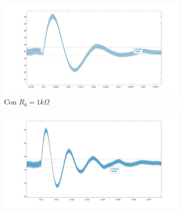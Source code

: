 \documentclass[e4_tp2_main.tex]{subfiles}
\begin{document}
\begin{figure}[H]
  \begin{subfigure}[b]{0.3\textwidth}
    \includegraphics[width=\textwidth, height=\textwidth]{Imagenes/Punto1/Test_con_R6_1k.jpeg}
    \caption{ Con $R_6=1k\Omega$}
    \label{fig:f1}
  \end{subfigure}
  \hfill
  \begin{subfigure}[b]{0.3\textwidth}
    \includegraphics[width=\textwidth, height=\textwidth]{Imagenes/Punto1/Test_con_R6_10k.jpeg}

\end{subfigure}
\end{figure}
\end{document}
